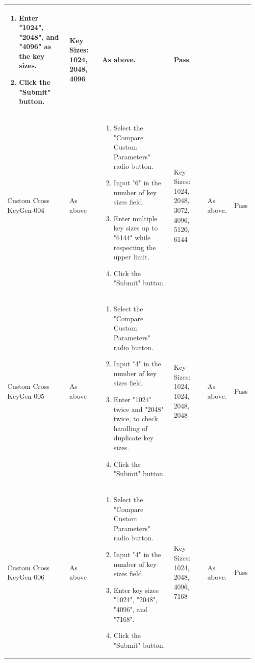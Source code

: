 \documentclass[]{final_report}
\theoremstyle{definition}
\begin{document}
\begin{longtable}{|p{1.5cm}|p{2.5cm}|p{3.5cm}|p{2.5cm}|p{3cm}|p{2cm}|}
\begin{enumerate}
    \item Enter "1024", "2048", and "4096" as the key sizes.
    \item Click the "Submit" button.
  \end{enumerate} & Key Sizes: 1024, 2048, 4096 & As above. & Pass \\
  \hline
  Custom
  Cross
  KeyGen-004 & As above & 
  \begin{enumerate}
    \item Select the "Compare Custom Parameters" radio button.
    \item Input "6" in the number of key sizes field.
    \item Enter multiple key sizes up to "6144" while respecting the upper limit.
    \item Click the "Submit" button.
  \end{enumerate} & Key Sizes: 1024, 2048, 3072, 4096, 5120, 6144 & As above. & Pass \\
  \hline
  Custom
  Cross
  KeyGen-005 & As above & 
  \begin{enumerate}
    \item Select the "Compare Custom Parameters" radio button.
    \item Input "4" in the number of key sizes field.
    \item Enter "1024" twice and "2048" twice, to check handling of duplicate key sizes.
    \item Click the "Submit" button.
  \end{enumerate} & Key Sizes: 1024, 1024, 2048, 2048 & As above. & Pass \\
  \hline
  Custom
  Cross
  KeyGen-006 & As above & 
  \begin{enumerate}
    \item Select the "Compare Custom Parameters" radio button.
    \item Input "4" in the number of key sizes field.
    \item Enter key sizes "1024", "2048", "4096", and "7168".
    \item Click the "Submit" button.
  \end{enumerate} & Key Sizes: 1024, 2048, 4096, 7168 & As above. & Pass \\
  \hline
\end{longtable}
\end{document}
